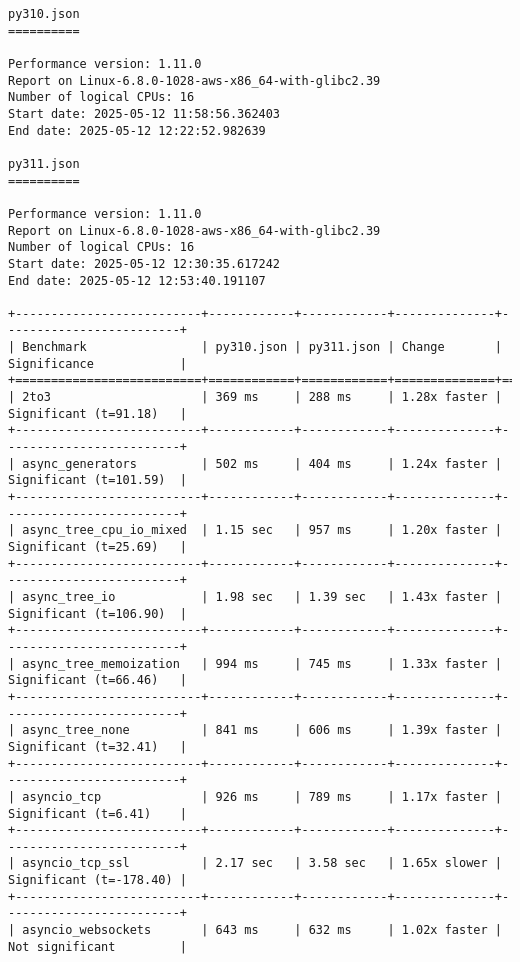 \begin{code}
    \begin{verbatim}
py310.json
==========

Performance version: 1.11.0
Report on Linux-6.8.0-1028-aws-x86_64-with-glibc2.39
Number of logical CPUs: 16
Start date: 2025-05-12 11:58:56.362403
End date: 2025-05-12 12:22:52.982639

py311.json
==========

Performance version: 1.11.0
Report on Linux-6.8.0-1028-aws-x86_64-with-glibc2.39
Number of logical CPUs: 16
Start date: 2025-05-12 12:30:35.617242
End date: 2025-05-12 12:53:40.191107

+--------------------------+------------+------------+--------------+-------------------------+
| Benchmark                | py310.json | py311.json | Change       | Significance            |
+==========================+============+============+==============+=========================+
| 2to3                     | 369 ms     | 288 ms     | 1.28x faster | Significant (t=91.18)   |
+--------------------------+------------+------------+--------------+-------------------------+
| async_generators         | 502 ms     | 404 ms     | 1.24x faster | Significant (t=101.59)  |
+--------------------------+------------+------------+--------------+-------------------------+
| async_tree_cpu_io_mixed  | 1.15 sec   | 957 ms     | 1.20x faster | Significant (t=25.69)   |
+--------------------------+------------+------------+--------------+-------------------------+
| async_tree_io            | 1.98 sec   | 1.39 sec   | 1.43x faster | Significant (t=106.90)  |
+--------------------------+------------+------------+--------------+-------------------------+
| async_tree_memoization   | 994 ms     | 745 ms     | 1.33x faster | Significant (t=66.46)   |
+--------------------------+------------+------------+--------------+-------------------------+
| async_tree_none          | 841 ms     | 606 ms     | 1.39x faster | Significant (t=32.41)   |
+--------------------------+------------+------------+--------------+-------------------------+
| asyncio_tcp              | 926 ms     | 789 ms     | 1.17x faster | Significant (t=6.41)    |
+--------------------------+------------+------------+--------------+-------------------------+
| asyncio_tcp_ssl          | 2.17 sec   | 3.58 sec   | 1.65x slower | Significant (t=-178.40) |
+--------------------------+------------+------------+--------------+-------------------------+
| asyncio_websockets       | 643 ms     | 632 ms     | 1.02x faster | Not significant         |

\end{verbatim}
\end{code}
